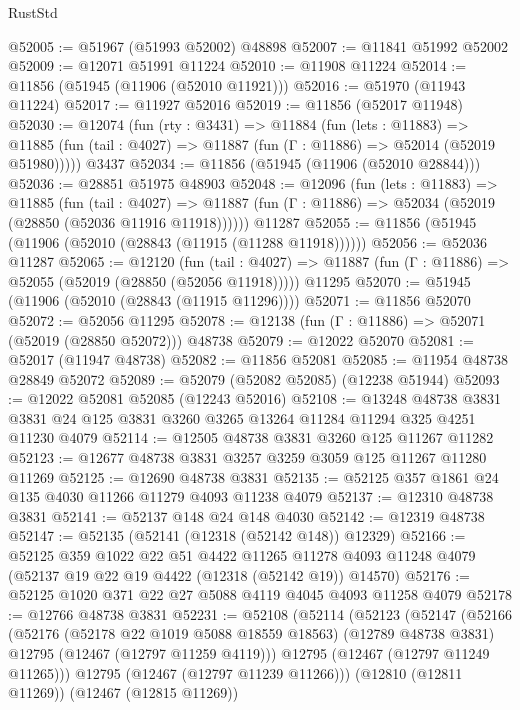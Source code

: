 \begin{lexlean}{RustStd}
\begin{coremodule}
@52005 := @51967 (@51993 @52002) @48898
@52007 := @11841 @51992 @52002
@52009 := @12071 @51991 @11224
@52010 := @11908 @11224
@52014 := @11856 (@51945 (@11906 (@52010 @11921)))
@52016 := @51970 (@11943 @11224)
@52017 := @11927 @52016
@52019 := @11856 (@52017 @11948)
@52030 := @12074
    (fun (rty : @3431) =>
    @11884
      (fun (lets : @11883) =>
      @11885 (fun (tail : @4027) => @11887 (fun (Γ : @11886) => @52014 (@52019 @51980)))))
    @3437
@52034 := @11856 (@51945 (@11906 (@52010 @28844)))
@52036 := @28851 @51975 @48903
@52048 := @12096
    (fun (lets : @11883) =>
    @11885
      (fun (tail : @4027) =>
      @11887 (fun (Γ : @11886) => @52034 (@52019 (@28850 (@52036 @11916 @11918))))))
    @11287
@52055 := @11856 (@51945 (@11906 (@52010 (@28843 (@11915 (@11288 @11918))))))
@52056 := @52036 @11287
@52065 := @12120
    (fun (tail : @4027) => @11887 (fun (Γ : @11886) => @52055 (@52019 (@28850 (@52056 @11918)))))
    @11295
@52070 := @51945 (@11906 (@52010 (@28843 (@11915 @11296))))
@52071 := @11856 @52070
@52072 := @52056 @11295
@52078 := @12138 (fun (Γ : @11886) => @52071 (@52019 (@28850 @52072))) @48738
@52079 := @12022 @52070
@52081 := @52017 (@11947 @48738)
@52082 := @11856 @52081
@52085 := @11954 @48738 @28849 @52072
@52089 := @52079 (@52082 @52085) (@12238 @51944)
@52093 := @12022 @52081 @52085 (@12243 @52016)
@52108 := @13248
    @48738
    @3831
    @3831
    @24
    @125
    @3831
    @3260
    @3265
    @13264
    @11284
    @11294
    @325
    @4251
    @11230
    @4079
@52114 := @12505 @48738 @3831 @3260 @125 @11267 @11282
@52123 := @12677 @48738 @3831 @3257 @3259 @3059 @125 @11267 @11280 @11269
@52125 := @12690 @48738 @3831
@52135 := @52125 @357 @1861 @24 @135 @4030 @11266 @11279 @4093 @11238 @4079
@52137 := @12310 @48738 @3831
@52141 := @52137 @148 @24 @148 @4030
@52142 := @12319 @48738
@52147 := @52135 (@52141 (@12318 (@52142 @148)) @12329)
@52166 := @52125
    @359
    @1022
    @22
    @51
    @4422
    @11265
    @11278
    @4093
    @11248
    @4079
    (@52137 @19 @22 @19 @4422 (@12318 (@52142 @19)) @14570)
@52176 := @52125 @1020 @371 @22 @27 @5088 @4119 @4045 @4093 @11258 @4079
@52178 := @12766 @48738 @3831
@52231 := @52108
    (@52114
      (@52123
        (@52147
          (@52166
            (@52176
              (@52178 @22 @1019 @5088 @18559 @18563)
              (@12789 @48738 @3831)
              @12795
              (@12467 (@12797 @11259 @4119)))
            @12795
            (@12467 (@12797 @11249 @11265)))
          @12795
          (@12467 (@12797 @11239 @11266)))
        (@12810 (@12811 @11269))
        (@12467 (@12815 @11269))

\end{coremodule}
\end{lexlean}
